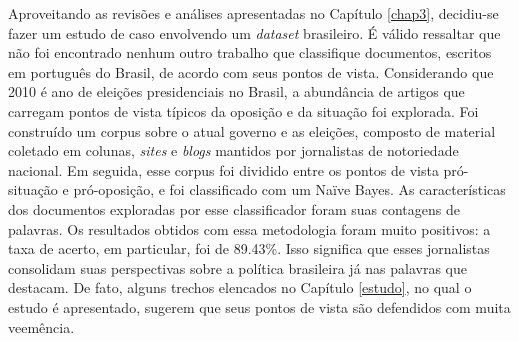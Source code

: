 
Aproveitando as revisões e análises apresentadas no Capítulo \ref{chap3}, decidiu-se fazer um estudo de caso envolvendo um \emph{dataset} brasileiro. É válido ressaltar que não foi encontrado nenhum outro trabalho que classifique documentos, escritos em português do Brasil, de acordo com seus pontos de vista. Considerando que 2010 é ano de eleições presidenciais no Brasil, a abundância de artigos que carregam pontos de vista típicos da oposição e da situação foi explorada. Foi construído um corpus sobre o atual governo e as eleições, composto de material coletado em colunas, \emph{sites} e \emph{blogs} mantidos por jornalistas de notoriedade nacional. Em seguida, esse corpus foi dividido entre os pontos de vista pró-situação e pró-oposição, e foi classificado com um Naïve Bayes. As características dos documentos exploradas por esse classificador foram suas contagens de palavras. Os resultados obtidos com essa metodologia foram muito positivos: a taxa de acerto, em particular, foi de 89.43\%. Isso significa que esses jornalistas consolidam suas perspectivas sobre a política brasileira já nas palavras que destacam. De fato, alguns trechos elencados no Capítulo \ref{estudo}, no qual o estudo é apresentado, sugerem que seus pontos de vista são defendidos com muita veemência. 

